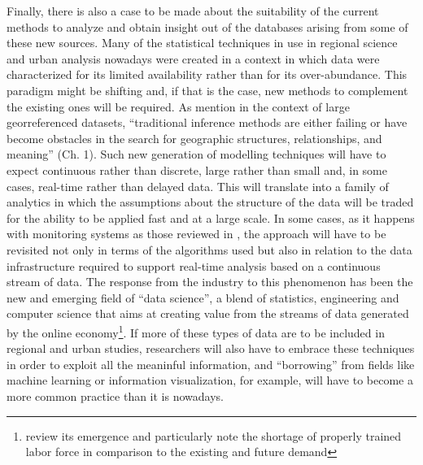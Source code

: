 \documentclass[12pt]{article}
\begin{document}
Finally, there is also a case to be made about the suitability of the current
methods to analyze and obtain insight out of the databases arising from some
of these new sources. 
%
Many of the statistical techniques in use in regional
science and urban analysis nowadays were created
in a context in which data were characterized for its limited availability rather than for its
over-abundance. 
%
This paradigm might be shifting and, if that is the case, new methods to complement the
existing ones will be required. 
%
As \cite{skupinAgarwal2007} mention in the context of large georreferenced
datasets, ``traditional inference methods are either
failing or have become obstacles in the search for geographic structures,
relationships, and meaning'' (Ch. 1).
%
Such new generation of modelling techniques
will have to expect continuous rather than discrete, large rather than small
and, in some cases, real-time rather than delayed data.
%
This will translate into a family of analytics in which the
assumptions about the structure of the data will be traded for the ability to
be applied fast and at a large scale.
In some cases, as it happens with monitoring systems as those reviewed
in \cite{kitchin2013}, the approach will have to be revisited not only in
terms of the algorithms used but also in relation to the data infrastructure required to
support real-time analysis based on a continuous stream of data.
%
The response from the industry to this phenomenon has been the new and emerging field of
``data science'', a blend of statistics, engineering and computer science
that aims at creating value from the streams of data generated by the online
economy\footnote{\citealp{mgi2012bigdata} review its emergence and particularly note the
shortage of properly trained labor force in comparison to the existing and
future demand}. 
If more of these types of data are to be included in regional and urban
studies, researchers will also have to embrace these techniques in
order to exploit all the meaninful information,
and ``borrowing'' from fields like machine learning or information
visualization, for example, will have to become a more common practice than it
is nowadays.
\end{document}
